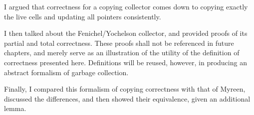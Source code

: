 I argued that correctness for a \gls{copying} \gls{collector} comes
down to copying exactly the \glspl{live cell} and updating all
\glspl{pointer} consistently.

I then talked about the Fenichel/Yochelson\cite{Fenichel69} collector,
and provided proofs of its partial and total correctness. These proofs
shall not be referenced in future chapters, and merely serve as an
illustration of the utility of the definition of correctness presented
here. Definitions will be reused, however, in producing an abstract
formalism of garbage collection.

Finally, I compared this formalism of copying correctness with that of
Myreen\cite{Myreen10}, discussed the differences, and then showed
their equivalence, given an additional lemma.
